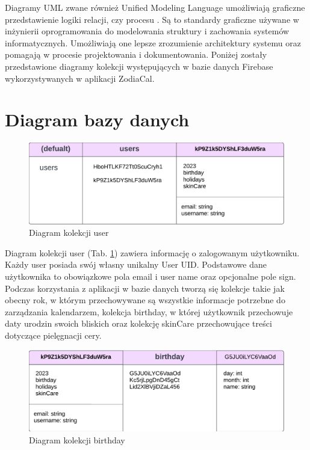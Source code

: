 \phantom{Th}
Diagramy UML zwane również Unified Modeling Language umożliwiają graficzne przedstawienie logiki relacji, czy procesu \cite{diagram}. Są to standardy graficzne używane w inżynierii oprogramowania do modelowania struktury i zachowania systemów informatycznych. Umożliwiają one lepsze zrozumienie architektury systemu oraz pomagają w procesie projektowania i dokumentowania. Poniżej zostały przedstawione diagramy kolekcji występujących w bazie danych Firebase wykorzystywanych w aplikacji ZodiaCal.

\section{Diagram bazy danych}

\begin{figure}[h]
	\centering
	\includegraphics[width=1\linewidth]{images/model_danych/user}
	\caption{Diagram kolekcji user}
	\label{fig:user}
\end{figure}

Diagram kolekcji user (Tab. \ref{fig:user}) zawiera informację o zalogowanym użytkowniku. Każdy user posiada swój własny unikalny User UID. Podstawowe dane użytkownika to obowiązkowe pola email i user name oraz opcjonalne pole sign. Podczas korzystania z aplikacji w bazie danych tworzą się kolekcje takie jak obecny rok, w którym przechowywane są wszystkie informacje potrzebne do zarządzania kalendarzem, kolekcja birthday, w której użytkownik przechowuje daty urodzin swoich bliskich oraz kolekcję skinCare przechowujące treści dotyczące pielęgnacji cery.

\newpage

\begin{figure}[h]
	\centering
	\includegraphics[width=1\linewidth]{images/model_danych/birthday}
	\caption{Diagram kolekcji birthday}
	\label{fig:birthday}
\end{figure}

